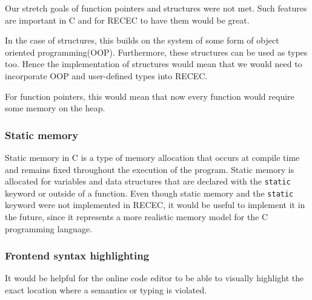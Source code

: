 \documentclass[a4paper]{article}
\begin{document}
Our stretch goals of function pointers and structures were not met. Such features are important in C and for RECEC to have them would be great. 

In the case of structures, this builds on the system of some form of object oriented programming(OOP). Furthermore, these structures can be used as types too. Hence the implementation of structures would mean that we would need to incorporate OOP and user-defined types into RECEC.

For function pointers, this would mean that now every function would require some memory on the heap.

\subsubsection{Static memory}

Static memory in C is a type of memory allocation that occurs at compile time and remains fixed throughout the execution of the program. Static memory is allocated for variables and data structures that are declared with the \texttt{static} keyword or outside of a function. Even though static memory and the \texttt{static} keyword were not implemented in RECEC, it would be useful to implement it in the future, since it represents a more realistic memory model for the C programming language.

\subsubsection{Frontend syntax highlighting}

It would be helpful for the online code editor to be able to visually highlight the exact location where a semantics or typing is violated.
\end{document}
